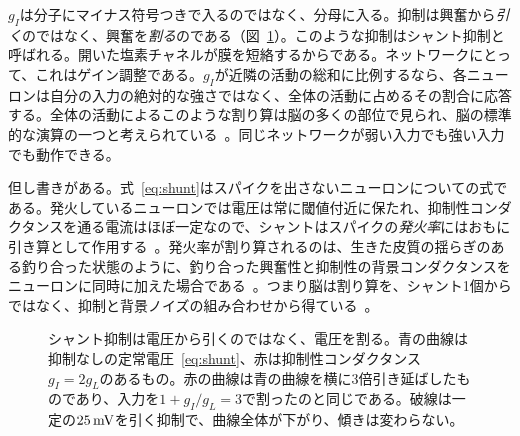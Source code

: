$g_I$は分子にマイナス符号つきで入るのではなく、分母に入る。抑制は興奮から\emph{引く}のではなく、興奮を\emph{割る}のである（図~\ref{fig:shunt}）。このような抑制はシャント抑制と呼ばれる。開いた塩素チャネルが膜を短絡するからである。ネットワークにとって、これはゲイン調整である。$g_I$が近隣の活動の総和に比例するなら、各ニューロンは自分の入力の絶対的な強さではなく、全体の活動に占めるその割合に応答する。全体の活動によるこのような割り算は脳の多くの部位で見られ、脳の標準的な演算の一つと考えられている~\cite{Carandini2012}。同じネットワークが弱い入力でも強い入力でも動作できる。

但し書きがある。式~\eqref{eq:shunt}はスパイクを出さないニューロンについての式である。発火しているニューロンでは電圧は常に閾値付近に保たれ、抑制性コンダクタンスを通る電流はほぼ一定なので、シャントはスパイクの\emph{発火率}にはおもに引き算として作用する~\cite{HoltKoch1997}。発火率が割り算されるのは、生きた皮質の揺らぎのある釣り合った状態のように、釣り合った興奮性と抑制性の背景コンダクタンスをニューロンに同時に加えた場合である~\cite{Chance2002}。つまり脳は割り算を、シャント1個からではなく、抑制と背景ノイズの組み合わせから得ている~\cite{Carandini2012}。

\begin{figure}[t]
\centering
{}
\caption{シャント抑制は電圧から引くのではなく、電圧を割る。青の曲線は抑制なしの定常電圧~\eqref{eq:shunt}、赤は抑制性コンダクタンス$g_I=2g_L$のあるもの。赤の曲線は青の曲線を横に3倍引き延ばしたものであり、入力を$1+g_I/g_L=3$で割ったのと同じである。破線は一定の$25\,\text{mV}$を引く抑制で、曲線全体が下がり、傾きは変わらない。}
\label{fig:shunt}
\end{figure}

